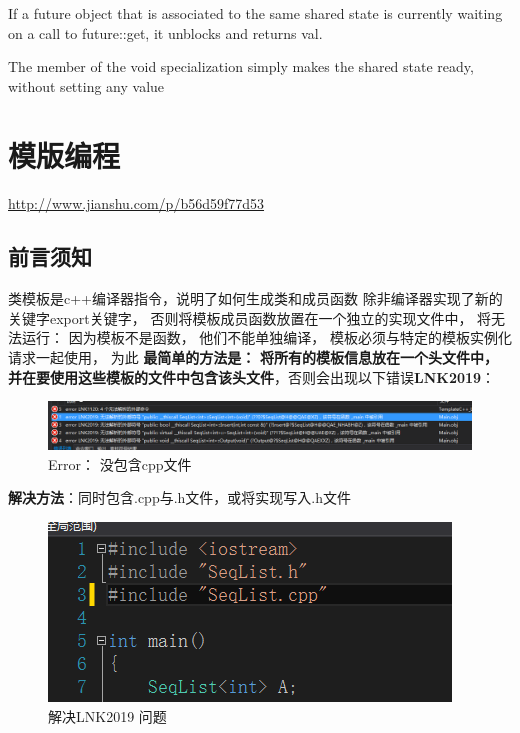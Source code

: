 \documentclass[UTF8,a4paper,12pt]{ctexbook}
\begin{document}
			If a future object that is associated to the same shared state is currently waiting on a call to future::get, it unblocks and returns val.
			
			The member of the void specialization simply makes the shared state ready, without setting any value	
	
\chapter{模版编程}
\url{http://www.jianshu.com/p/b56d59f77d53}
\section{前言须知}
	类模板是c++编译器指令，说明了如何生成类和成员函数 除非编译器实现了新的关键字export关键字， 否则将模板成员函数放置在一个独立的实现文件中， 将无法运行： 因为模板不是函数， 他们不能单独编译， 模板必须与特定的模板实例化请求一起使用， 为此 \textbf{最简单的方法是： }\textbf{将所有的模板信息放在一个头文件中， 并在要使用这些模板的文件中包含该头文件}，否则会出现以下错误\textbf{LNK2019}：
	
		\begin{figure}[h]
			\centering
			\includegraphics[width = 14cm]{MustKnowError.png}
			\caption{Error： 没包含cpp文件}
		\end{figure}
		
	\textbf{解决方法}：同时包含.cpp与.h文件，或将实现写入.h文件
		\begin{figure}[h]
			\centering
			\includegraphics[scale = 0.6]{TemplateFirst.png}
			\caption{解决LNK2019 问题}
		\end{figure}	
 
\end{document}
